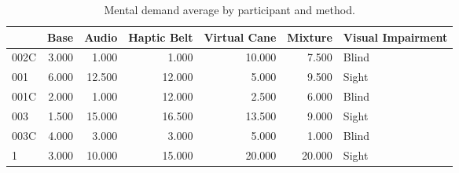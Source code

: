 
\begin{table}[!htb]
\centering
\caption{Mental demand average by participant and method.}
\label{tab:md_average}
\begin{tabular}{lrrrrrl}
\toprule
{} &  Base &  Audio &  Haptic Belt &  Virtual Cane &  Mixture & Visual Impairment \\
\midrule
002C & 3.000 &  1.000 &        1.000 &        10.000 &    7.500 &             Blind \\
001  & 6.000 & 12.500 &       12.000 &         5.000 &    9.500 &             Sight \\
001C & 2.000 &  1.000 &       12.000 &         2.500 &    6.000 &             Blind \\
003  & 1.500 & 15.000 &       16.500 &        13.500 &    9.000 &             Sight \\
003C & 4.000 &  3.000 &        3.000 &         5.000 &    1.000 &             Blind \\
1    & 3.000 & 10.000 &       15.000 &        20.000 &   20.000 &             Sight \\
\bottomrule
\end{tabular}
\end{table}

